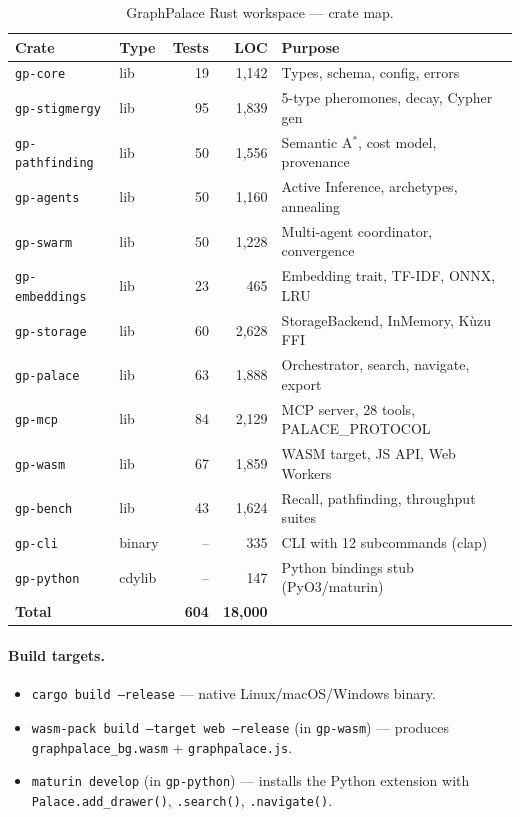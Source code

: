 \documentclass[11pt,a4paper]{article}
\begin{document}
\begin{table}[ht]
\centering
\caption{GraphPalace Rust workspace --- crate map.}
\label{tab:crates}
\setlength{\tabcolsep}{5pt}
\begin{tabular}{llrrl}
\toprule
\textbf{Crate} & \textbf{Type} & \textbf{Tests} & \textbf{LOC} & \textbf{Purpose} \\
\midrule
\texttt{gp-core}        & lib    &  19 & 1,142 & Types, schema, config, errors \\
\texttt{gp-stigmergy}   & lib    &  95 & 1,839 & 5-type pheromones, decay, Cypher gen \\
\texttt{gp-pathfinding} & lib    &  50 & 1,556 & Semantic A$^*$, cost model, provenance \\
\texttt{gp-agents}      & lib    &  50 & 1,160 & Active Inference, archetypes, annealing \\
\texttt{gp-swarm}       & lib    &  50 & 1,228 & Multi-agent coordinator, convergence \\
\texttt{gp-embeddings}  & lib    &  23 &   465 & Embedding trait, TF-IDF, ONNX, LRU \\
\texttt{gp-storage}     & lib    &  60 & 2,628 & StorageBackend, InMemory, Kùzu FFI \\
\texttt{gp-palace}      & lib    &  63 & 1,888 & Orchestrator, search, navigate, export \\
\texttt{gp-mcp}         & lib    &  84 & 2,129 & MCP server, 28 tools, PALACE\_PROTOCOL \\
\texttt{gp-wasm}        & lib    &  67 & 1,859 & WASM target, JS API, Web Workers \\
\texttt{gp-bench}       & lib    &  43 & 1,624 & Recall, pathfinding, throughput suites \\
\texttt{gp-cli}         & binary &  --  &   335 & CLI with 12 subcommands (clap) \\
\texttt{gp-python}      & cdylib &  --  &   147 & Python bindings stub (PyO3/maturin) \\
\midrule
\textbf{Total}          &        & \textbf{604} & \textbf{18,000} & \\
\bottomrule
\end{tabular}
\end{table}

\paragraph{Build targets.}
\begin{itemize}[nosep]
\item \texttt{cargo build --release} --- native Linux/macOS/Windows binary.
\item \texttt{wasm-pack build --target web --release} (in \texttt{gp-wasm}) ---
      produces \texttt{graphpalace\_bg.wasm} + \texttt{graphpalace.js}.
\item \texttt{maturin develop} (in \texttt{gp-python}) --- installs the Python
      extension with \texttt{Palace.add\_drawer()}, \texttt{.search()},
      \texttt{.navigate()}.
\end{itemize}
\end{document}
